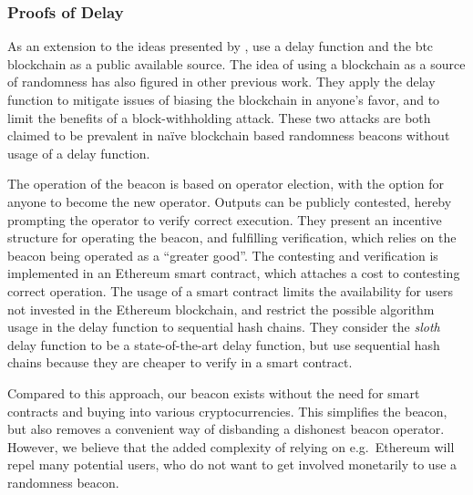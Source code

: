 \subsubsection{Proofs of Delay}%
\label{ssub:proofs_of_delay}
As an extension to the ideas presented by \citet{randomzoo}, \citet{bunz2017proofsof} use a delay function and the \gls{btc} blockchain as a public available source.
The idea of using a blockchain as a source of randomness has also figured in other previous work.
They apply the delay function to mitigate issues of biasing the blockchain in anyone's favor, and to limit the benefits of a block-withholding attack.
These two attacks are both claimed to be prevalent in naïve blockchain based randomness beacons without usage of a delay function.

The operation of the beacon is based on operator election, with the option for anyone to become the new operator.
Outputs can be publicly contested, hereby prompting the operator to verify correct execution.
They present an incentive structure for operating the beacon, and fulfilling verification, which relies on the beacon being operated as a \enquote{greater good}.
The contesting and verification is implemented in an Ethereum smart contract, which attaches a cost to contesting correct operation.
The usage of a smart contract limits the availability for users not invested in the Ethereum blockchain, and restrict the possible algorithm usage in the delay function to sequential hash chains.
They consider the \textit{sloth} delay function to be a state-of-the-art delay function, but use sequential hash chains because they are cheaper to verify in a smart contract.

Compared to this approach, our beacon exists without the need for smart contracts and buying into various cryptocurrencies.
This simplifies the beacon, but also removes a convenient way of disbanding a dishonest beacon operator.
However, we believe that the added complexity of relying on e.g.\ Ethereum will repel many potential users, who do not want to get involved monetarily to use a randomness beacon.

